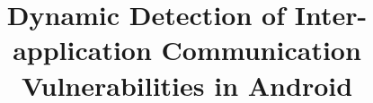 \documentclass[pldi]{sigplanconf}
\begin{document}
\title{Dynamic Detection of Inter-application Communication Vulnerabilities in Android}

\maketitle











%



%






%
\end{document}
